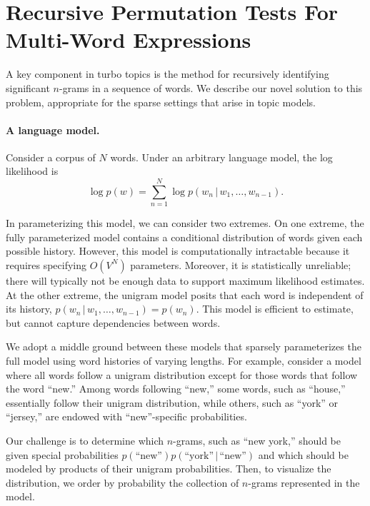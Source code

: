 \documentclass[11pt]{article}
\begin{document}
\section{Recursive Permutation Tests For Multi-Word Expressions}
\label{sec:model}

A key component in turbo topics is the method for recursively
identifying significant $n$-grams in a sequence of words.  We describe
our novel solution to this problem, appropriate for the sparse
settings that arise in topic models.

\paragraph{A language model.}  Consider a corpus of $N$ words. Under
an arbitrary language model, the log likelihood is
\begin{equation}
\label{eq:likelihood}
  \log p(w) =
  \textstyle \sum_{n=1}^{N} \log p(w_n {\,|\,} w_1, \ldots, w_{n-1}).
\end{equation}

In parameterizing this model, we can consider two extremes.  On one
extreme, the fully parameterized model contains a conditional
distribution of words given each possible history.  However, this
model is computationally intractable because it requires specifying
$O(V^N)$ parameters.  Moreover, it is statistically unreliable; there
will typically not be enough data to support maximum likelihood
estimates.  At the other extreme, the unigram model posits that each
word is independent of its history, $p(w_n {\,|\,} w_1, \ldots, w_{n-1}) =
p(w_n)$.  This model is efficient to estimate, but cannot capture
dependencies between words.

We adopt a middle ground between these models that sparsely
parameterizes the full model using word histories of varying lengths.
For example, consider a model where all words follow a unigram
distribution except for those words that follow the word ``new.''
Among words following ``new,'' some words, such as ``house,''
essentially follow their unigram distribution, while others, such as
``york'' or ``jersey,'' are endowed with ``new''-specific
probabilities.

Our challenge is to determine which $n$-grams, such as ``new york,''
should be given special probabilities $p(\textrm{``new''})
p(\textrm{``york''} {\,|\,} \textrm{``new''})$ and which should be modeled
by products of their unigram probabilities.  Then, to visualize the
distribution, we order by probability the collection of $n$-grams
represented in the model.
\end{document}
